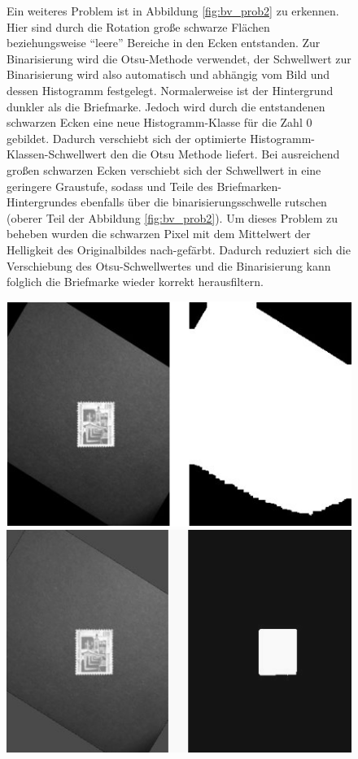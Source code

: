 \documentclass[12pt,toc=bib,toc=listof]{scrreprt}
\begin{document}
\begin{figure}[h]
\begin{minipage}[t]{.75\linewidth}
Ein weiteres Problem ist in Abbildung \ref{fig:bv_prob2} zu erkennen. Hier sind durch die Rotation große schwarze Flächen beziehungsweise ``leere'' Bereiche in den Ecken entstanden. Zur Binarisierung wird die Otsu-Methode verwendet, der Schwellwert zur Binarisierung wird also automatisch und abhängig vom Bild und dessen Histogramm festgelegt. Normalerweise ist der Hintergrund dunkler als die Briefmarke. Jedoch wird durch die entstandenen schwarzen Ecken eine neue Histogramm-Klasse für die Zahl 0 gebildet. Dadurch verschiebt sich der optimierte Histogramm-Klassen-Schwellwert den die Otsu Methode liefert. Bei ausreichend großen schwarzen Ecken verschiebt sich der Schwellwert in eine geringere Graustufe, sodass und Teile des Briefmarken-Hintergrundes ebenfalls über die binarisierungsschwelle rutschen (oberer Teil der Abbildung \ref{fig:bv_prob2}). Um dieses Problem zu beheben wurden die schwarzen Pixel mit dem Mittelwert der Helligkeit des Originalbildes nach-gefärbt. Dadurch reduziert sich die Verschiebung des Otsu-Schwellwertes und die Binarisierung kann folglich die Briefmarke wieder korrekt herausfiltern.
\end{minipage}
\hfill
\begin{minipage}[t]{.2\linewidth}
  \strut\vspace*{-\baselineskip}\newline\includegraphics[width=\linewidth]{./../bilder/prob2_bad_bin}
  \includegraphics[width=\linewidth]{./../bilder/prob2_good_bin}

\end{minipage}
\end{figure}
\end{document}
